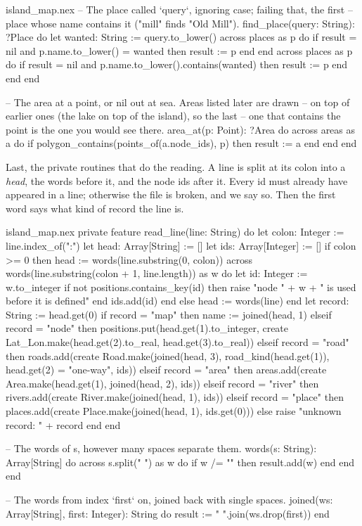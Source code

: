 \begin{continued}{island_map.nex}
  -- The place called `query`, ignoring case; failing that, the first
  -- place whose name contains it ("mill" finds "Old Mill").
  find_place(query: String): ?Place do
    let wanted: String := query.to_lower()
    across places as p do
      if result = nil and p.name.to_lower() = wanted then
        result := p
      end
    end
    across places as p do
      if result = nil and p.name.to_lower().contains(wanted) then
        result := p
      end
    end
  end

  -- The area at a point, or nil out at sea. Areas listed later are drawn
  -- on top of earlier ones (the lake on top of the island), so the last
  -- one that contains the point is the one you would see there.
  area_at(p: Point): ?Area do
    across areas as a do
      if polygon_contains(points_of(a.node_ids), p) then
        result := a
      end
    end
  end
\end{continued}

Last, the private routines that do the reading. A line is split at its
colon into a \emph{head}, the words before it, and the node ids after it.
Every id must already have appeared in a  line; otherwise the
file is broken, and we say so. Then the first word says what kind of
record the line is.

\begin{continued}{island_map.nex}
private feature
  read_line(line: String) do
    let colon: Integer := line.index_of(":")
    let head: Array[String] := []
    let ids: Array[Integer] := []
    if colon >= 0 then
      head := words(line.substring(0, colon))
      across words(line.substring(colon + 1, line.length)) as w do
        let id: Integer := w.to_integer
        if not positions.contains_key(id) then
          raise "node " + w + " is used before it is defined"
        end
        ids.add(id)
      end
    else
      head := words(line)
    end
    let record: String := head.get(0)
    if record = "map" then
      name := joined(head, 1)
    elseif record = "node" then
      positions.put(head.get(1).to_integer,
        create Lat_Lon.make(head.get(2).to_real, head.get(3).to_real))
    elseif record = "road" then
      roads.add(create Road.make(joined(head, 3), road_kind(head.get(1)),
        head.get(2) = "one-way", ids))
    elseif record = "area" then
      areas.add(create Area.make(head.get(1), joined(head, 2), ids))
    elseif record = "river" then
      rivers.add(create River.make(joined(head, 1), ids))
    elseif record = "place" then
      places.add(create Place.make(joined(head, 1), ids.get(0)))
    else
      raise "unknown record: " + record
    end
  end

  -- The words of s, however many spaces separate them.
  words(s: String): Array[String] do
    across s.split(" ") as w do
      if w /= "" then
        result.add(w)
      end
    end
  end

  -- The words from index `first` on, joined back with single spaces.
  joined(ws: Array[String], first: Integer): String do
    result := " ".join(ws.drop(first))
  end
\end{continued}

